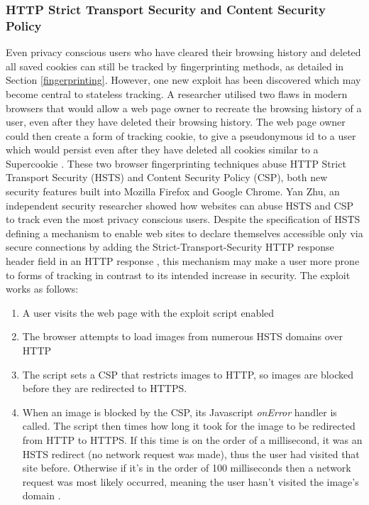 \documentclass[12pt]{article}
\begin{document}
\subsubsection{HTTP Strict Transport Security and Content Security Policy}
Even privacy conscious users who have cleared their browsing history and deleted all saved cookies can still be tracked by fingerprinting methods, as detailed in Section \ref{fingerprinting}. However, one new exploit has been discovered which may become central to stateless tracking. A researcher utilised two flaws in modern browsers that would allow a web page owner to recreate the browsing history of a user, even after they have deleted their browsing history. The web page owner could then create a form of tracking cookie, to give a pseudonymous id to a user which would persist even after they have deleted all cookies similar to a Supercookie \parencite{newTracking}. These two browser fingerprinting techniques abuse HTTP Strict Transport Security (HSTS) and Content Security Policy (CSP), both new security features built into Mozilla Firefox and Google Chrome. Yan Zhu, an independent security researcher showed how websites can abuse HSTS and CSP to track even the most privacy conscious users. Despite the specification of HSTS defining a mechanism to enable web sites to declare themselves accessible only via secure connections by adding the Strict-Transport-Security HTTP response header field in an HTTP response \parencite{HSTS}, this mechanism may make a user more prone to forms of tracking in contrast to its intended increase in security. The exploit works as follows: 

\begin{enumerate}
    \item A user visits the web page with the exploit script enabled
    \item The browser attempts to load images from numerous HSTS domains over HTTP
    \item The script sets a CSP that restricts images to HTTP, so images are blocked before they are redirected to HTTPS. 
    \item When an image is blocked by the CSP, its Javascript \textit{onError} handler is called. The script then times how long it took for the image to be redirected from HTTP to HTTPS. If this time is on the order of a millisecond, it was an HSTS redirect (no network request was made), thus the user had visited that site before. Otherwise if it's in the order of 100 milliseconds then a network request was most likely occurred, meaning the user hasn't visited the image's domain \parencite{gitSniffly}. 
\end{enumerate} 
\end{document}
